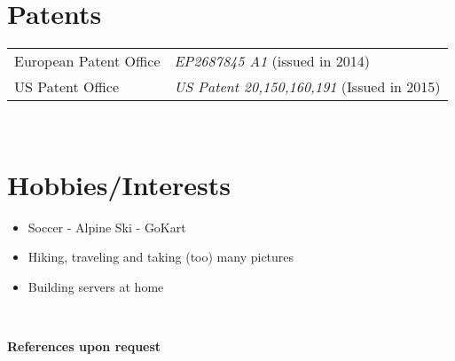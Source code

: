 \documentclass{CV}
\begin{document}




\section*{Patents}
\vspace{-1.5em}
	\begin{center}
	\begin{tabular}{ll}
	European Patent Office & \textit{EP2687845 A1} (issued in 2014)\\
	US Patent Office & \textit{US Patent 20,150,160,191} (Issued in 2015)
	\end{tabular}
	\end{center}
~




\section*{Hobbies/Interests}
\begin{itemize}\setlength\itemsep{0em}
\item Soccer - Alpine Ski - GoKart
\item Hiking, traveling and taking (too) many pictures
\item Building servers at home
\end{itemize}
~




\begin{center}
\Large \textbf{References upon request}
\end{center}
\end{document}
